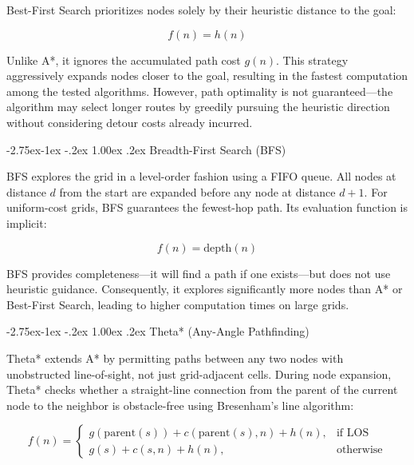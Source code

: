 \documentclass[11pt,a4paper,twocolumn]{article}
\makeatletter
\renewcommand{\subsection}{\@startsection{subsection}{2}{\z@}%
  {-2.75ex\@plus -1ex \@minus -.2ex}%
  {1.00ex \@plus .2ex}%
  {\normalfont\normalsize\bfseries\itshape}}
\makeatother
\begin{document}
Best-First Search prioritizes nodes solely by their heuristic distance to the goal:

\begin{equation}
f(n) = h(n)
\end{equation}

\noindent Unlike A*, it ignores the accumulated path cost $g(n)$. This strategy aggressively expands nodes closer to the goal, resulting in the fastest computation among the tested algorithms. However, path optimality is not guaranteed---the algorithm may select longer routes by greedily pursuing the heuristic direction without considering detour costs already incurred.

\subsection{Breadth-First Search (BFS)}

BFS explores the grid in a level-order fashion using a FIFO queue. All nodes at distance $d$ from the start are expanded before any node at distance $d+1$. For uniform-cost grids, BFS guarantees the fewest-hop path. Its evaluation function is implicit:

\begin{equation}
f(n) = \text{depth}(n)
\end{equation}

\noindent BFS provides completeness---it will find a path if one exists---but does not use heuristic guidance. Consequently, it explores significantly more nodes than A* or Best-First Search, leading to higher computation times on large grids.

\subsection{Theta* (Any-Angle Pathfinding)}

Theta* \cite{nash2007theta} extends A* by permitting paths between any two nodes with unobstructed line-of-sight, not just grid-adjacent cells. During node expansion, Theta* checks whether a straight-line connection from the parent of the current node to the neighbor is obstacle-free using Bresenham's line algorithm:

\begin{equation}
f(n) = 
\begin{cases}
g(\text{parent}(s)) + c(\text{parent}(s), n) + h(n), & \text{if LOS} \\
g(s) + c(s, n) + h(n), & \text{otherwise}
\end{cases}
\end{equation}
\end{document}
